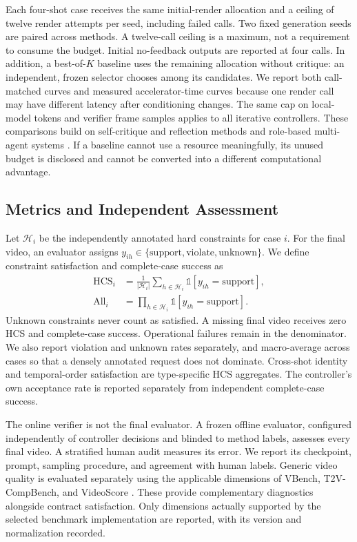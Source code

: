 Each four-shot case receives the same initial-render allocation and a ceiling
of twelve render attempts per seed, including failed calls. Two fixed generation
seeds are paired across methods. A twelve-call ceiling is a maximum, not a
requirement to consume the budget. Initial no-feedback outputs are reported at
four calls. In addition, a best-of-$K$ baseline uses the remaining allocation
without critique: an independent, frozen selector chooses among its candidates.
We report both call-matched curves and measured accelerator-time curves because
one render call may have different latency after conditioning changes. The same
cap on local-model tokens and verifier frame samples applies to all iterative
controllers. These comparisons build on self-critique and reflection methods
\citep{madaan2023selfrefine,shinn2023reflexion} and role-based multi-agent
systems \citep{hong2024metagpt,wu2024autogen}. If a baseline cannot use a resource meaningfully, its unused budget
is disclosed and cannot be converted into a different computational advantage.

\subsection{Metrics and Independent Assessment}
\label{sec:metrics}
Let $\mathcal{H}_i$ be the independently annotated hard constraints for case $i$.
For the final video, an evaluator assigns
$y_{ih}\in\{\mathrm{support},\mathrm{violate},\mathrm{unknown}\}$.
We define constraint satisfaction and complete-case success as
\begin{align}
\operatorname{HCS}_i & =
\frac{1}{|\mathcal{H}_i|}\sum_{h\in\mathcal{H}_i}
\mathbb{1}[y_{ih}=\mathrm{support}], \\
\operatorname{All}_i & =
\prod_{h\in\mathcal{H}_i}\mathbb{1}[y_{ih}=\mathrm{support}].
\end{align}
Unknown constraints never count as satisfied. A missing final video receives
zero HCS and complete-case success. Operational failures remain in the
denominator. We also report violation and unknown rates separately, and
macro-average across cases so that a densely annotated request does not dominate.
Cross-shot identity and temporal-order satisfaction are type-specific HCS
aggregates. The controller's own acceptance rate is reported separately from
independent complete-case success.

The online verifier is not the final evaluator. A frozen offline evaluator,
configured independently of controller decisions and blinded to method labels,
assesses every final video. A stratified human audit measures its error.
We report its checkpoint, prompt, sampling procedure, and agreement with human
labels. Generic video quality is evaluated separately using the applicable
dimensions of VBench, T2V-CompBench, and VideoScore
\citep{huang2023vbench,sun2025t2vcompbench,he2024videoscore}. These provide
complementary diagnostics alongside contract satisfaction.
Only dimensions actually supported by the selected benchmark implementation
are reported, with its version and normalization recorded.

